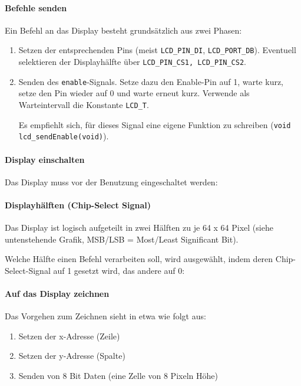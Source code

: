 \paragraph{Befehle senden}
Ein Befehl an das Display besteht grundsätzlich aus zwei Phasen:
\begin{enumerate}
\item Setzen der entsprechenden Pins (meist \lstinline{LCD_PIN_DI}, \lstinline{LCD_PORT_DB}).
	Eventuell selektieren der Displayhälfte über \lstinline{LCD_PIN_CS1, LCD_PIN_CS2}.

\item Senden des \lstinline{enable}-Signals.
	Setze dazu den Enable-Pin auf 1, warte kurz, setze den Pin wieder auf 0 und warte erneut kurz.
	Verwende als Warteintervall die Konstante \lstinline{LCD_T}.

	Es empfiehlt sich, für dieses Signal eine eigene Funktion zu schreiben (\lstinline{void lcd_sendEnable(void)}).
\end{enumerate}

\paragraph{Display einschalten}
Das Display muss vor der Benutzung eingeschaltet werden:


\paragraph{Displayhälften (Chip-Select Signal)}
Das Display ist logisch aufgeteilt in zwei Hälften zu je 64 x 64 Pixel (siehe untenstehende Grafik, MSB/LSB = Most/Least Significant Bit).

Welche Hälfte einen Befehl verarbeiten soll, wird ausgewählt, indem deren Chip-Select-Signal auf 1 gesetzt wird, das andere auf 0:


\paragraph{Auf das Display zeichnen}
Das Vorgehen zum Zeichnen sieht in etwa wie folgt aus:
\begin{enumerate}
	\item Setzen der x-Adresse (Zeile)
	\item Setzen der y-Adresse (Spalte)
	\item Senden von 8 Bit Daten (eine \glqq{}Zelle\grqq{} von 8 Pixeln Höhe)
\end{enumerate}

